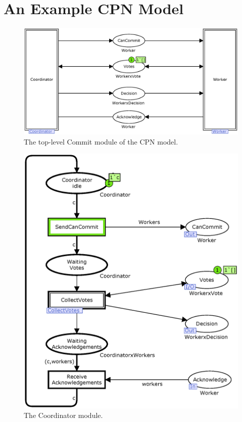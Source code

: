 \section{An Example CPN Model}

\begin{figure}[t]
\centering
\includegraphics[width=15cm]{figures/Commit.eps}
\caption{The top-level Commit module of the CPN model.}
\end{figure}

\begin{figure}[t]
\centering
\includegraphics[width=\columnwidth]{figures/Coordinator.eps}
\caption{The Coordinator module.}
\end{figure}

